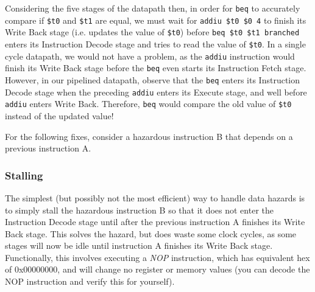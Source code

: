 \documentclass{article}
\begin{document}
Considering the five stages of the datapath then, in order for \texttt{beq} to accurately compare if \texttt{\$t0} and \texttt{\$t1} are equal, we must wait for \texttt{addiu \$t0 \$0 4} to finish its Write Back stage (i.e. updates the value of \texttt{\$t0}) before \texttt{beq \$t0 \$t1 branched} enters its Instruction Decode stage and tries to read the value of \texttt{\$t0}. In a single cycle datapath, we would not have a problem, as the \texttt{addiu} instruction would finish its Write Back stage before the \texttt{beq} even starts its Instruction Fetch stage. However, in our pipelined datapath, observe that the \texttt{beq} enters its Instruction Decode stage when the preceding \texttt{addiu} enters its Execute stage, and well before \texttt{addiu} enters Write Back. Therefore,  \texttt{beq} would compare the old value of  \texttt{\$t0} instead of the updated value!

For the following fixes, consider a hazardous instruction B that depends on a previous instruction A.

 \subsubsection{Stalling}
 The simplest (but possibly not the most efficient) way to handle data hazards is to simply stall the hazardous instruction B so that it does not enter the Instruction Decode stage until after the previous instruction A finishes its Write Back stage. This solves the hazard, but does waste some clock cycles, as some stages will now be idle until instruction A finishes its Write Back stage. Functionally, this involves executing a \textit{NOP} instruction, which has equivalent hex of 0x00000000, and will change no register or memory values (you can decode the NOP instruction and verify this for yourself). %
 
\end{document}
